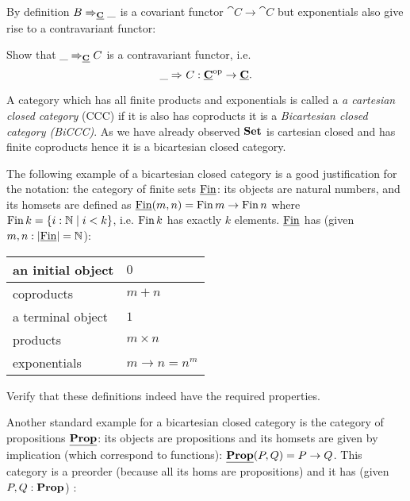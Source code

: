 By definition $\expC{\cat{C}}{B}{\_}$ is a covariant functor $\cat{C} \to \cat{C}$ but exponentials also give rise to a contravariant functor:
\begin{Exercise}
Show that $\expC{\cat{C}}{\_}{C}$ is a contravariant functor, i.e. 
\[\expC{}{\_}{C} : \cat{C}^\op \to \cat{C}.\]     
\end{Exercise}

A category which has all finite products and exponentials is called a \emph{a cartesian closed category} (CCC) if it is also has coproducts it is a \emph{Bicartesian closed category (BiCCC)}. As we have already observed $\Set$ is cartesian closed and has finite coproducts hence it is a bicartesian closed category. 

The following example of a bicartesian closed category is a good justification for the notation: the category of finite sets $\cat{\Fin}$: its objects are natural numbers, and its homsets are defined as $\cat{\Fin}(m,n) = \Fin\, m \to \Fin\,n$ where $\Fin\,k = \{ i : \Nat \mid i < k\}$, i.e. $\Fin\,k$ has exactly $k$ elements. $\cat{\Fin}$ has (given $m,n : \obj{\cat{\Fin}}=\Nat$):

\begin{tabular}{|l|l|}
\hline
an initial object & $0$ \\ \hline
coproducts & $m + n$ \\ \hline
a terminal object & $1$ \\\hline
products & $m\times n$ \\\hline
exponentials & $m \to n = n^m$\\\hline
\end{tabular}


\begin{Exercise}
Verify that these definitions indeed have the required properties.
\end{Exercise}

Another standard example for a bicartesian closed category is the category of propositions $\cat{\Prop}$: its objects are propositions and its homsets are given by implication (which correspond to functions): $\cat{\Prop}(P,Q) = P \to Q$. This category is a preorder (because all its homs are propositions) and it has (given $P,Q : \Prop$) :

